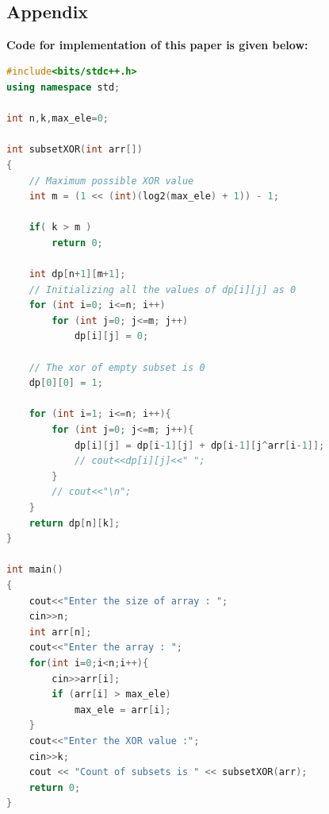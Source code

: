 \documentclass[conference]{IEEEtran}
\begin{document}
\color{black}
\
\begin{titlepage}
    \begin{center}
        \Huge
        \section*{Appendix}
        \end{center}
         \textbf{Code for implementation of this paper is given below:}
\begin{lstlisting}[language=C++,caption=Code for this paper]
#include<bits/stdc++.h>
using namespace std;

int n,k,max_ele=0;

int subsetXOR(int arr[])
{
	// Maximum possible XOR value
	int m = (1 << (int)(log2(max_ele) + 1)) - 1;

	if( k > m )
	    return 0;

	int dp[n+1][m+1];
	// Initializing all the values of dp[i][j] as 0
	for (int i=0; i<=n; i++)
		for (int j=0; j<=m; j++)
			dp[i][j] = 0;

	// The xor of empty subset is 0
	dp[0][0] = 1;

	for (int i=1; i<=n; i++){
		for (int j=0; j<=m; j++){
            dp[i][j] = dp[i-1][j] + dp[i-1][j^arr[i-1]];
            // cout<<dp[i][j]<<" ";
        }
        // cout<<"\n";
    }
	return dp[n][k];
}

int main()
{
    cout<<"Enter the size of array : ";
    cin>>n;
    int arr[n];
    cout<<"Enter the array : ";
    for(int i=0;i<n;i++){
        cin>>arr[i];
        if (arr[i] > max_ele)
		    max_ele = arr[i];
    }
    cout<<"Enter the XOR value :";
    cin>>k;
	cout << "Count of subsets is " << subsetXOR(arr);
	return 0;
}
   
\end{lstlisting}
\end{titlepage}
\end{document}
